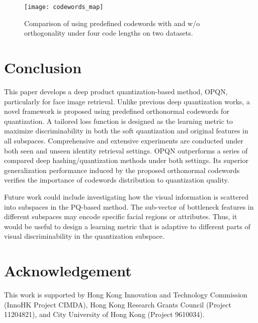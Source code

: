 \documentclass{elsarticle}
\begin{document}
\begin{figure}[htbp]
	\centering
	\texttt{[image: codewords\_map]}
	\caption{Comparison of using predefined codewords with and w/o orthogonality under four code lengths on two datasets.}
	\label{exp_ortho}
\end{figure}

\section{Conclusion}\label{sec:6}
This paper develops a deep product quantization-based method, OPQN, particularly for face image retrieval. Unlike previous deep quantization works, a novel framework is proposed using predefined orthonormal codewords for quantization. A tailored loss function is designed as the learning metric to maximize discriminability in both the soft quantization and original features in all subspaces. Comprehensive and extensive experiments are conducted under both seen and unseen identity retrieval settings. OPQN outperforms a series of compared deep hashing/quantization methods under both settings. Its superior generalization performance induced by the proposed orthonormal codewords verifies the importance of codewords distribution to quantization quality.

Future work could include investigating how the visual information is scattered into subspaces in the PQ-based method. The sub-vector of bottleneck features in different subspaces may encode specific facial regions or attributes. Thus, it would be useful to design a learning metric that is adaptive to different parts of visual discriminability in the quantization subspace. 

\section*{Acknowledgement}
This work is supported by Hong Kong Innovation and Technology Commission (InnoHK Project CIMDA), Hong Kong Research Grants Council (Project 11204821), and City University of Hong Kong (Project 9610034).
\footnotesize
{\linespread{1.3}
{}
}
\end{document}
